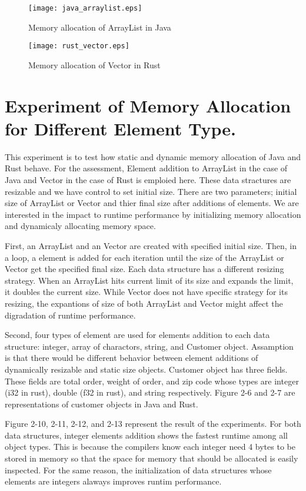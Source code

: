 \begin{figure}[htb]
    \texttt{[image: java\_arraylist.eps]}
    \caption{Memory allocation of ArrayList in Java}
    \label{fig:Sampling}
\end{figure}

\begin{figure}[htb]
    \texttt{[image: rust\_vector.eps]}
    \caption{Memory allocation of Vector in Rust}
    \label{fig:Sampling}
\end{figure}



\section{Experiment of Memory Allocation for Different Element Type.}
\label{sec:history}
This experiment is to test how static and dynamic memory allocation of Java and Rust behave. For the assessment, Element addition to ArrayList in the case of Java and Vector in the case of Rust 
is emploied here. These data stractures are resizable and we have control to set initial size. There are two parameters; initial size of ArrayList or Vector and thier final size after additions of elements. 
We are interested in the impact to runtime performance by initializing memory allocation and dynamicaly allocating memory space.

First, an ArrayList and an Vector are created with specified initial size. Then, in a loop, a element is added for each iteration until the size of the ArrayList or Vector get the specified final size. 
Each data structure has a different resizing strategy. When an ArrayList hits current limit of its size and expands the limit, it doubles the current size.  
While Vector does not have specific strategy for its resizing, the expantions of size of both ArrayList and Vector might affect the digradation of runtime performance.

Second, four types of element are used for elements addition to each data structure: integer, array of charactors, string, and Customer object. 
Assamption is that there would be different behavior between element additions of dynamically resizable and static size objects. 
Customer object has three fields. These fields are total order, weight of order, and zip code whose types are integer (i32 in rust), double (f32 in rust), and string respectively.
Figure 2-6 and 2-7 are representations of customer objects in Java and Rust.

Figure 2-10, 2-11, 2-12, and 2-13 represent the result of the experiments. For both data structures, integer elements addition shows the fastest runtime among all object types. 
This is because the compilers know each integer need 4 bytes to be stored in memory so that the space for memory that should be allocated is easily inspected. 
For the same reason, the initialization of data structures whose elements are integers alaways improves runtim performance.


